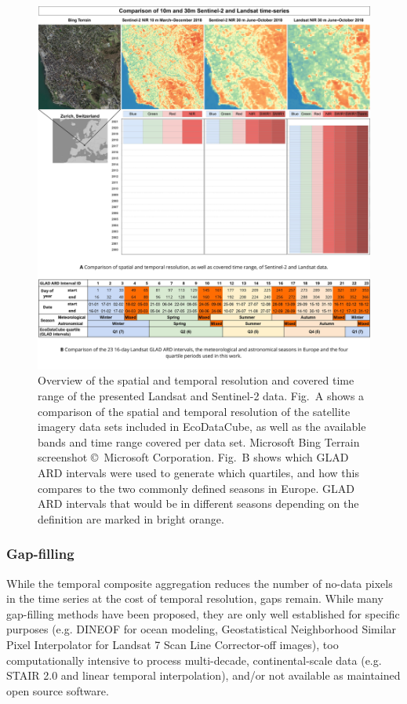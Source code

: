 \begin{figure}[!hbt]
\centering
\includegraphics[width=\linewidth]{figs_02/fig_3_satellite_comparison.png}
\caption{Overview of the spatial and temporal resolution and covered time range of the presented Landsat and Sentinel-2 data. Fig.\@~A shows a comparison of the spatial and temporal resolution of the satellite imagery data sets included in EcoDataCube, as well as the available bands and time range covered per data set. Microsoft Bing Terrain screenshot \copyright~Microsoft Corporation. Fig.\@~B shows which GLAD ARD intervals were used to generate which quartiles, and how this compares to the two commonly defined seasons in Europe. GLAD ARD intervals that would be in different seasons depending on the definition are marked in bright orange.}
\label{fig:3_methods_satellite_comparison_and_intervals_seasons_quartiles}
\end{figure}

\subsubsection*{Gap-filling}

While the temporal composite aggregation reduces the number of no-data pixels in the time series at the cost of temporal resolution, gaps remain. While many gap-filling methods have been proposed, they are only well established for specific purposes (e.g. DINEOF \citep{azcarate2005dineof} for ocean modeling, Geostatistical Neighborhood Similar Pixel Interpolator \citep{zhu2012gnspi} for Landsat 7 Scan Line Corrector-off images), too computationally intensive to process multi-decade, continental-scale data (e.g. STAIR 2.0 \citep{luo2020stair} and linear temporal interpolation), and/or not available as maintained open source software. 

